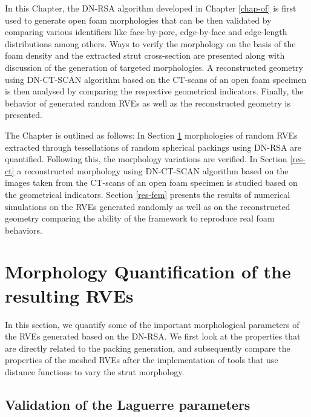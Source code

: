 In this Chapter, the DN-RSA algorithm developed in Chapter \ref{chap-of} is first used to generate open foam morphologies that can be then validated by comparing various identifiers like face-by-pore, edge-by-face and edge-length distributions among others. Ways to verify the morphology on the basis of the foam density and the extracted strut cross-section are presented along with discussion of the generation of targeted morphologies. A reconstructed geometry using DN-CT-SCAN algorithm based on the CT-scans of an open foam specimen is then analysed by comparing the respective geometrical indicators. Finally, the behavior of generated random RVEs as well as the reconstructed geometry is presented.

The Chapter is outlined as follows: In Section \ref{res-random} morphologies of random RVEs extracted through tessellations of random spherical packings using DN-RSA are quantified. Following this, the morphology variations are verified. In Section \ref{res-ct} a reconstructed morphology using DN-CT-SCAN algorithm based on the images taken from the CT-scans of an open foam specimen is studied based on the geometrical indicators. Section \ref{res-fem} presents the results of numerical simulations on the RVEs generated randomly as well as on the reconstructed geometry comparing the ability of the framework to reproduce real foam behaviors.


\section{Morphology Quantification of the resulting RVEs}\label{res-random}
In this section, we quantify some of the important morphological parameters of the RVEs generated based on the  DN-RSA. We  first look at the properties that are directly related to the packing generation, and subsequently compare the properties of the meshed RVEs after the implementation of tools that use distance functions to vary the strut morphology.

\subsection{Validation of the Laguerre parameters}

